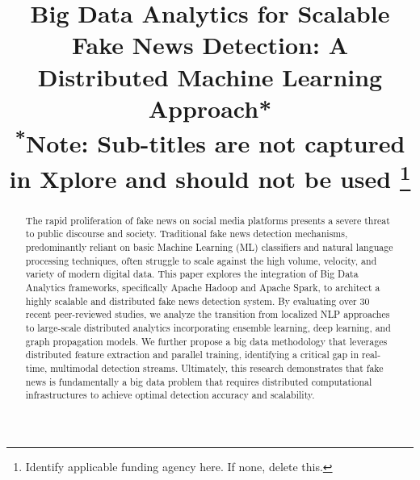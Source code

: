 \documentclass[conference]{IEEEtran}
\begin{document}
\title{Big Data Analytics for Scalable Fake News Detection: A Distributed Machine Learning Approach*\\
{\footnotesize \textsuperscript{*}Note: Sub-titles are not captured in Xplore and
should not be used}
\thanks{Identify applicable funding agency here. If none, delete this.}
}

\author{
\and
{}
\and
{}
}

\maketitle

\begin{abstract}
The rapid proliferation of fake news on social media platforms presents a severe threat to public discourse and society. Traditional fake news detection mechanisms, predominantly reliant on basic Machine Learning (ML) classifiers and natural language processing techniques, often struggle to scale against the high volume, velocity, and variety of modern digital data. This paper explores the integration of Big Data Analytics frameworks, specifically Apache Hadoop and Apache Spark, to architect a highly scalable and distributed fake news detection system. By evaluating over 30 recent peer-reviewed studies, we analyze the transition from localized NLP approaches to large-scale distributed analytics incorporating ensemble learning, deep learning, and graph propagation models. We further propose a big data methodology that leverages distributed feature extraction and parallel training, identifying a critical gap in real-time, multimodal detection streams. Ultimately, this research demonstrates that fake news is fundamentally a big data problem that requires distributed computational infrastructures to achieve optimal detection accuracy and scalability.
\end{abstract}
\end{document}
